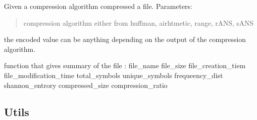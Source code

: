 \documentclass[letterpaper,10pt,english]{sphinxmanual}
\begin{document}
\begin{fulllineitems}

\begin{fulllineitems}
\label{\detokenize{file_compressor:file_compressor.FileCompressor.file_encode}}
\pysigstartsignatures
{}
\pysigstopsignatures
\sphinxAtStartPar
Given a compression algorithm compressed a file. 
Parameters:
\begin{quote}
\begin{description}
\sphinxAtStartPar
compression algorithm either from huffman, airhtmetic, range, rANS, sANS

\end{description}
\end{quote}
\begin{description}
\begin{description}
\sphinxAtStartPar
the encoded value can be anything depending on the output of the compression algorithm.

\end{description}

\end{description}

\end{fulllineitems}


\begin{fulllineitems}
\label{\detokenize{file_compressor:file_compressor.FileCompressor.summary}}
\pysigstartsignatures
{}
\pysigstopsignatures
\sphinxAtStartPar
function that gives summary of the file
:
file\_name
file\_size
file\_creation\_tiem
file\_modification\_time
total\_symbols
unique\_symbols
frequeency\_dist
shannon\_entrory
compressed\_size
compression\_ratio

\end{fulllineitems}


\end{fulllineitems}


\sphinxstepscope


\subsection{Utils}
\label{\detokenize{utils:utils}}\label{\detokenize{utils::doc}}
\end{document}

